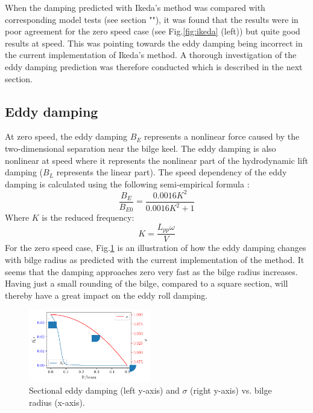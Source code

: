 When the damping predicted with Ikeda's method was compared with
corresponding model tests (see section ""), it
was found that the results were in poor agreement for the zero speed
case (see Fig.\ref{fig:ikeda} (left)) but quite good results at
speed. This was pointing towards the eddy damping being incorrect in the
current implementation of Ikeda's method. A thorough investigation of
the eddy damping prediction was therefore conducted which is described
in the next section.
\subsection*{Eddy damping}\label{eddy-damping}
At zero speed, the eddy damping $B_E$ represents a nonlinear force
caused by the two-dimensional separation near the bilge keel. The eddy
damping is also nonlinear at speed where it represents the nonlinear
part of the hydrodynamic lift damping ($B_L$ represents the linear
part). The speed dependency of the eddy damping is calculated using the
following semi-empirical formula \citep{7505983/937PN5DT}:
\begin{equation}
\frac{B_{E}}{B_{E0}} = \frac{0.0016 K^{2}}{0.0016 K^{2} + 1}
\label{eq:eddy_speed}
\end{equation}
Where $K$ is the reduced frequency:
\begin{equation}
K = \frac{L_{pp} \omega}{V}
\label{eq:K}
\end{equation}
For the zero speed case, Fig.\ref{fig:eddy_sigma} is an
illustration of how the eddy damping changes with bilge radius as
predicted with the current implementation of the method. It seems that
the damping approaches zero very fast as the bilge radius increases.
Having just a small rounding of the bilge, compared to a square section,
will thereby have a great impact on the eddy roll damping.
\begin{figure}[H]
\begin{center}\includegraphics[width = 0.475\textwidth]{figures/eddy_sigma.pdf}\end{center}
\vspace{-0.7cm}
\caption{Sectional eddy damping (left y-axis) and $\sigma$ (right y-axis) vs. bilge radius (x-axis).}
\label{fig:eddy_sigma}
\end{figure}
